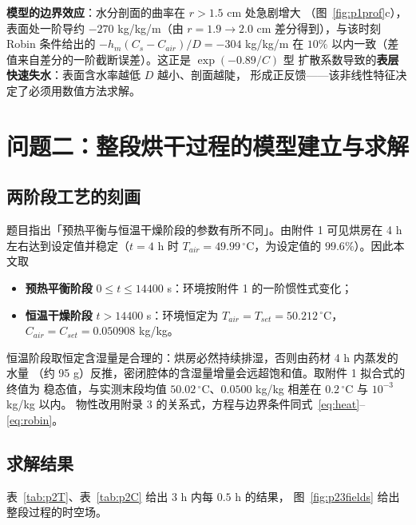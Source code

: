 \textbf{模型的边界效应}：水分剖面的曲率在 $r>1.5$ cm 处急剧增大
（图~\ref{fig:p1prof}c），表面处一阶导约 $-270$ kg/kg/m（由 $r=1.9\to2.0$ cm
差分得到），与该时刻 Robin 条件给出的 $-h_m(C_s-C_{air})/D=-304$ kg/kg/m 在
$10\%$ 以内一致（差值来自差分的一阶截断误差）。这正是 $\exp(-0.89/C)$ 型
扩散系数导致的\textbf{表层快速失水}：表面含水率越低 $D$ 越小、剖面越陡，
形成正反馈——该非线性特征决定了必须用数值方法求解。

\section{问题二：整段烘干过程的模型建立与求解}

\subsection{两阶段工艺的刻画}

题目指出「预热平衡与恒温干燥阶段的参数有所不同」。由附件 1 可见烘房在 4 h
左右达到设定值并稳定（$t=4$ h 时 $T_{air}=49.99\,^\circ$C，为设定值的
$99.6\%$）。因此本文取

\begin{itemize}
  \item \textbf{预热平衡阶段} $0\le t\le14400$ s：环境按附件 1 的一阶惯性式变化；
  \item \textbf{恒温干燥阶段} $t>14400$ s：环境恒定为
  $T_{air}=T_{set}=50.212\,^\circ$C，$C_{air}=C_{set}=0.050908$ kg/kg。
\end{itemize}

恒温阶段取恒定含湿量是合理的：烘房必然持续排湿，否则由药材 4 h 内蒸发的水量
（约 95 g）反推，密闭腔体的含湿量增量会远超饱和值。取附件 1 拟合式的终值为
稳态值，与实测末段均值 $50.02\,^\circ$C、$0.0500$ kg/kg 相差在
$0.2\,^\circ$C 与 $10^{-3}$ kg/kg 以内。
物性改用附录 3 的关系式，方程与边界条件同式~\eqref{eq:heat}--\eqref{eq:robin}。

\subsection{求解结果}

表~\ref{tab:p2T}、表~\ref{tab:p2C} 给出 3 h 内每 $0.5$ h 的结果，
图~\ref{fig:p23fields} 给出整段过程的时空场。

